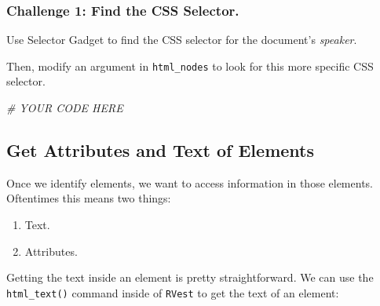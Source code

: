\documentclass[
]{book}
\newenvironment{Shaded}{\begin{snugshade}}{\end{snugshade}}
\newcommand{\CommentTok}[1]{\textcolor[rgb]{0.56,0.35,0.01}{\textit{#1}}}
\newcommand{\KeywordTok}[1]{\textcolor[rgb]{0.13,0.29,0.53}{\textbf{#1}}}
\newcommand{\NormalTok}[1]{#1}
\newcommand{\OperatorTok}[1]{\textcolor[rgb]{0.81,0.36,0.00}{\textbf{#1}}}
\newcommand{\StringTok}[1]{\textcolor[rgb]{0.31,0.60,0.02}{#1}}
\providecommand{\tightlist}{%
  \setlength{\itemsep}{0pt}\setlength{\parskip}{0pt}}
\begin{document}
\hypertarget{challenge-1-find-the-css-selector.}{%
\subsubsection*{Challenge 1: Find the CSS Selector.}\label{challenge-1-find-the-css-selector.}}

Use Selector Gadget to find the CSS selector for the document's \emph{speaker}.

Then, modify an argument in \texttt{html\_nodes} to look for this more specific CSS selector.

\begin{Shaded}
\begin{Highlighting}[]
\CommentTok{# YOUR CODE HERE}
\end{Highlighting}
\end{Shaded}

\hypertarget{get-attributes-and-text-of-elements}{%
\subsection{Get Attributes and Text of Elements}\label{get-attributes-and-text-of-elements}}

Once we identify elements, we want to access information in those elements. Oftentimes this means two things:

\begin{enumerate}
\def\labelenumi{\arabic{enumi})}
\tightlist
\item
  Text.
\item
  Attributes.
\end{enumerate}

Getting the text inside an element is pretty straightforward. We can use the \texttt{html\_text()} command inside of \texttt{RVest} to get the text of an element:

\begin{Shaded}
\end{Shaded}
\end{document}
